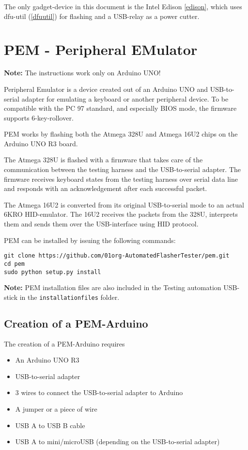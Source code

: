 \documentclass[a4paper,11pt]{article}
\newcommand{\note}{\textbf{Note: }}
\newcommand{\cmd}[1]{\texttt{#1}}
\begin{document}
The only gadget-device in this document is the Intel Edison \ref{edison}, which uses dfu-util (\ref{dfuutil}) for flashing and a USB-relay as a power cutter.

\section{PEM - Peripheral EMulator}
\label{pem}

\note{The instructions work only on Arduino UNO!}

Peripheral Emulator is a device created out of an Arduino UNO and USB-to-serial adapter for emulating a keyboard or another peripheral device. To be compatible with the PC 97 standard, and especially BIOS mode, the firmware supports 6-key-rollover.

PEM works by flashing both the Atmega 328U and Atmega 16U2 chips on the Arduino UNO R3 board. 

The Atmega 328U is flashed with a firmware that takes care of the communication between the testing harness and the USB-to-serial adapter. The firmware receives keyboard states from the testing harness over serial data line and responds with an acknowledgement after each successful packet.

The Atmega 16U2 is converted from its original USB-to-serial mode to an actual 6KRO HID-emulator. The 16U2 receives the packets from the 328U, interprets them and sends them over the USB-interface using HID protocol.

PEM can be installed by issuing the following commands:
\begin{lstlisting}
git clone https://github.com/01org-AutomatedFlasherTester/pem.git
cd pem
sudo python setup.py install
\end{lstlisting}
\note{PEM installation files are also included in the Testing automation USB-stick in the \cmd{installationfiles} folder.}

\subsection{Creation of a PEM-Arduino}
\label{pemarduino}
The creation of a PEM-Arduino requires 
\begin{itemize}
\item An Arduino UNO R3
\item USB-to-serial adapter
\item 3 wires to connect the USB-to-serial adapter to Arduino
\item A jumper or a piece of wire
\item USB A to USB B cable
\item USB A to mini/microUSB (depending on the USB-to-serial adapter)
\end{itemize}
\end{document}

